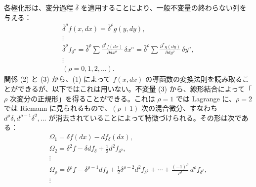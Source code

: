 \documentclass[11pt]{article}
\newcommand{\bdelta}{\bar{\delta}}
\begin{document}
各極化形は、変分過程 \(\bdelta\) を適用することにより、一般不変量の終わらない列を与える：
\begin{equation}
\begin{gathered}
\bdelta^\rho f(x,dx)=\bdelta^\rho g(y,dy),\\
\vdots\\
\bdelta^\rho f_{\delta^\sigma}
=\bdelta^\rho\sum\frac{\partial^\sigma f(dx)}{\partial dx^\sigma}\,
\delta x^\sigma
=\bdelta^\rho\sum\frac{\partial^\sigma g(dy)}{\partial dy^\sigma}\,
\delta y^\sigma,\\
\vdots\\[0.2em]
(\rho=0,1,2,\ldots).
\end{gathered}
\tag{3}
\end{equation}
関係 (2) と (3) から、(1) によって \(f(x,dx)\) の導函数の変換法則を読み取ることができるが、以下ではこれは用いない。不変量 (3) から、線形結合によって「\(\rho\) 次変分の正規形」を得ることができる。これは \(\rho=1\) では Lagrange に、\(\rho=2\) では Riemann に見られるもので、\((\rho+1)\) 次の混合微分、すなわち \(d^\rho\delta,d^{\rho-1}\delta^2,\ldots\) が消去されていることによって特徴づけられる。その形は次である：
\begin{equation}
\begin{gathered}
\Omega_1=\delta f(dx)-d f_\delta(dx),\\
\Omega_2=\delta^2 f-\delta d f_\delta+\frac12 d^2 f_{\delta^2},\\
\vdots\\
\Omega_\rho=\delta^\rho f-\delta^{\rho-1}d f_\delta
+\frac12\delta^{\rho-2}d^2 f_{\delta^2}
+\cdots+\frac{(-1)^\rho}{\rho!}\,d^\rho f_{\delta^\rho},\\
\vdots
\end{gathered}
\tag{4}
\end{equation}
\end{document}
